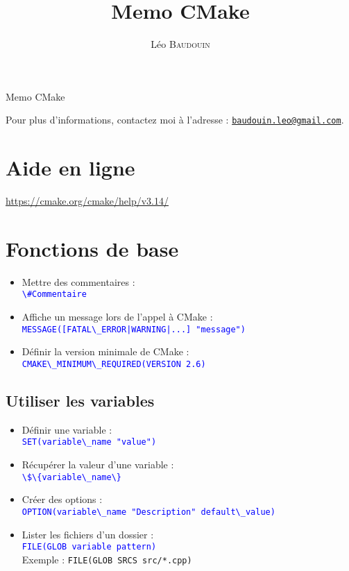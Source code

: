 \documentclass[a4paper,oneside]{article}
\title{\huge Memo CMake}
\author{L\'eo \textsc{Baudouin}}
\date{}
\begin{document}
{\Huge Memo CMake}
\newline

\noindent Pour plus d'informations, contactez moi à l'adresse : 
\href{mailto:baudouin.leo@gmail.com}{\nolinkurl{baudouin.leo@gmail.com}}.

\section{Aide en ligne}

\url{https://cmake.org/cmake/help/v3.14/}


\section{Fonctions de base}
\begin{itemize}
\item Mettre des commentaires :\\
  \textcolor{blue}{\verb?\#Commentaire ?}
\item Affiche un message lors de l'appel à CMake :\\
  \textcolor{blue}{\verb?MESSAGE([FATAL\_ERROR|WARNING|...] "message") ?}
\item Définir la version minimale de CMake :\\
  \textcolor{blue}{\verb?CMAKE\_MINIMUM\_REQUIRED(VERSION 2.6)?}
\end{itemize}

\subsection{Utiliser les variables}
\begin{itemize}
\item Définir une variable :\\
  \textcolor{blue}{\verb?SET(variable\_name "value")?}
\item Récupérer la valeur d'une variable :\\
  \textcolor{blue}{\verb?\$\{variable\_name\}?}
\item Créer des options :\\
  \textcolor{blue}{\verb?OPTION(variable\_name "Description" default\_value)?}
\item Lister les fichiers d'un dossier :\\
  \textcolor{blue}{\verb?FILE(GLOB variable pattern)?}\\
  Exemple : \verb?FILE(GLOB SRCS src/*.cpp)?
\end{itemize}
\end{document}
